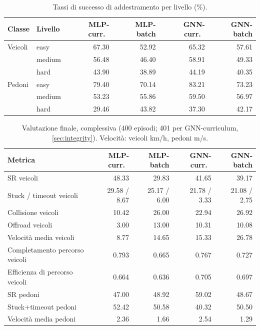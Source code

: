 \begin{table}[h]
  \centering\small
  \caption{Tassi di successo di addestramento per livello (\%).}
  \begin{tabular}{@{}llrrrr@{}}
    \toprule
    Classe & Livello & MLP-curr.\ & MLP-batch & GNN-curr.\ & GNN-batch \\
    \midrule
    Veicoli & easy & 67.30 & 52.92 & 65.32 & 57.61 \\
             & medium & 56.48 & 46.40 & 58.91 & 49.33 \\
             & hard & 43.90 & 38.89 & 44.19 & 40.35 \\
    \addlinespace
    Pedoni & easy & 79.40 & 70.14 & 83.21 & 73.23 \\
             & medium & 53.23 & 55.86 & 59.50 & 56.97 \\
             & hard & 29.46 & 43.82 & 37.30 & 42.17 \\
    \bottomrule
  \end{tabular}
\end{table}

\begin{table}[h]
  \centering\small
  \caption{Valutazione finale, complessiva (400 episodi; 401 per
  GNN-curriculum, \cref{sec:integrity}). Velocità: veicoli km/h, pedoni
  m/s.}
  \begin{tabular}{@{}lrrrr@{}}
    \toprule
    Metrica & MLP-curr.\ & MLP-batch & GNN-curr.\ & GNN-batch \\
    \midrule
    SR veicoli & 48.33 & 29.83 & 41.65 & 39.17 \\
    Stuck / timeout veicoli & 29.58 / 8.67 & 25.17 / 6.00 & 21.78 / 3.33 & 21.08 / 2.75 \\
    Collisione veicoli & 10.42 & 26.00 & 22.94 & 26.92 \\
    Offroad veicoli & 3.00 & 13.00 & 10.31 & 10.08 \\
    Velocità media veicoli & 8.77 & 14.65 & 15.33 & 26.78 \\
    Completamento percorso veicoli & 0.793 & 0.665 & 0.767 & 0.727 \\
    Efficienza di percorso veicoli & 0.664 & 0.636 & 0.705 & 0.697 \\
    \addlinespace
    SR pedoni & 47.00 & 48.92 & 59.02 & 48.67 \\
    Stuck$+$timeout pedoni & 52.42 & 50.58 & 40.32 & 50.50 \\
    Velocità media pedoni & 2.36 & 1.66 & 2.54 & 1.29 \\
    \bottomrule
  \end{tabular}
\end{table}

